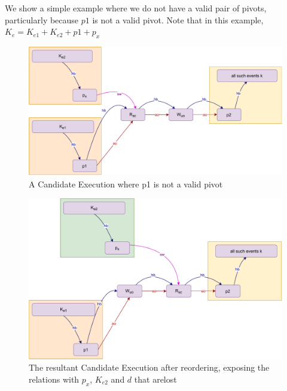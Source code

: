     We show a simple example where we do not have a valid pair of pivots, particularly because $p1$ is not a valid pivot. Note that in this example, $K_e = K_{e1} + K_{e2} + p1 + p_x$
    \begin{figure}[H]
        \centering
        \includegraphics[scale=0.6]{5.InstructionReordering/4.ValidReorderingCandidate/ProofParts/Part1/part1(e).pdf}
        \caption{A Candidate Execution where p1 is not a valid pivot}
        \label{fig:my_label}
    \end{figure}
    
    \begin{figure}[H]
        \centering
        \includegraphics[scale=0.6]{5.InstructionReordering/4.ValidReorderingCandidate/ProofParts/Part1/part1(f).pdf}
        \caption{The resultant Candidate Execution after reordering, exposing the relations with $p_x$, $K_{e2}$ and $d$ that arelost}
        \label{fig:my_label}
    \end{figure}
        
